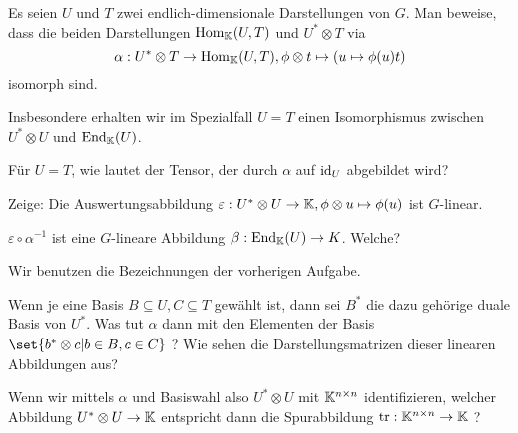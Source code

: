 \begin{sheet}
\begin{problem}[title={Isomorphismus zwischen Tensorprodukt und linearen Abbildungen}]\label{ex:hom_tensor_isomorphismus}
\begin{subproblem}
Es seien $U$ und $T$ zwei endlich-dimensionale Darstellungen von $G$. Man beweise, dass die beiden Darstellungen $\operatorname{Hom}_{\mathbb{K}}(U,T)$ und $U^\ast \otimes T$ via
\[\alpha: U^\ast \otimes T \to \operatorname{Hom}_{\mathbb{K}}(U,T), \phi \otimes t \mapsto (u\mapsto \phi(u)t)\]
isomorph sind.
\end{subproblem}

Insbesondere erhalten wir im Spezialfall $U=T$ einen Isomorphismus zwischen $U^\ast\otimes U$ und $\operatorname{End}_{\mathbb{K}}(U)$.

\begin{subproblem}
Für $U=T$, wie lautet der Tensor, der durch $\alpha$ auf $\operatorname{id}_U$ abgebildet wird?
\end{subproblem}

\begin{subproblem}
Zeige: Die Auswertungsabbildung $\varepsilon: U^\ast \otimes U \to \mathbb{K}, \phi\otimes u\mapsto \phi(u)$ ist $G$-linear.
\end{subproblem}

\begin{subproblem}
$\varepsilon\circ\alpha^{-1}$ ist eine $G$-lineare Abbildung $\beta: \operatorname{End}_{\mathbb{K}}(U) \to K$. Welche?
\end{subproblem}

\end{problem}

\begin{problem}[title={\enquote{Matrizen als 2-Tensoren}}]\label{tensoren:ex:matrizen}
Wir benutzen die Bezeichnungen der vorherigen Aufgabe.
\begin{subproblem}
Wenn je eine Basis $B\subseteq U, C\subseteq T$ gewählt ist, dann sei $B^\ast$ die dazu gehörige duale Basis von $U^\ast$. Was tut $\alpha$ dann mit den Elementen der Basis $\set{b^\ast\otimes c | b\in B, c\in C}$ ? Wie sehen die Darstellungsmatrizen dieser linearen Abbildungen aus?
\end{subproblem}

\begin{subproblem}\label{tensoren:ex:matrizen:spur}
Wenn wir mittels $\alpha$ und Basiswahl also $U^\ast\otimes U$ mit $\mathbb{K}^{n\times n}$ identifizieren, welcher Abbildung $U^\ast \otimes U \to \mathbb{K}$ entspricht dann die Spurabbildung $\operatorname{tr}: \mathbb{K}^{n\times n}\to\mathbb{K}$ ?
\end{subproblem}
\end{problem}


\end{sheet}
